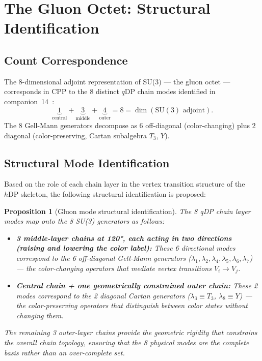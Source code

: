 \documentclass[12pt]{article}
\newtheorem{proposition}[theorem]{Proposition}
\newcommand{\qDP}{q\mathrm{DP}}
\newcommand{\hDP}{h\mathrm{DP}}
\begin{document}
\section{The Gluon Octet: Structural Identification}
\label{sec:gluons}

\subsection{Count Correspondence}

The 8-dimensional adjoint representation of SU(3) --- the gluon
octet --- corresponds in CPP to the 8 distinct $\qDP$ chain modes
identified in companion~14~\cite{c14}:
\begin{equation}
\underbrace{1}_{\text{central}} +
\underbrace{3}_{\text{middle}} +
\underbrace{4}_{\text{outer}} = 8 = \dim(\text{SU}(3)\text{ adjoint}).
\label{eq:8count}
\end{equation}
The 8 Gell-Mann generators decompose as 6 off-diagonal (color-changing)
plus 2 diagonal (color-preserving, Cartan subalgebra $T_3$, $Y$).

\subsection{Structural Mode Identification}

Based on the role of each chain layer in the vertex transition
structure of the $\hDP$ skeleton, the following structural
identification is proposed:

\begin{proposition}[Gluon mode structural identification]
\label{prop:gluon_modes}
The 8 qDP chain layer modes map onto the 8 SU(3) generators as follows:
\begin{itemize}
\item \textbf{3 middle-layer chains at 120°, each acting in two
  directions (raising and lowering the color label):}
  These 6 directional modes correspond to the 6 off-diagonal
  Gell-Mann generators ($\lambda_1, \lambda_2, \lambda_4,
  \lambda_5, \lambda_6, \lambda_7$) --- the color-changing
  operators that mediate vertex transitions $V_i \to V_j$.

\item \textbf{Central chain + one geometrically constrained outer
  chain:}
  These 2 modes correspond to the 2 diagonal Cartan generators
  ($\lambda_3 \equiv T_3$, $\lambda_8 \equiv Y$) --- the
  color-preserving operators that distinguish between color states
  without changing them.
\end{itemize}
The remaining 3 outer-layer chains provide the geometric rigidity
that constrains the overall chain topology, ensuring that the 8
physical modes are the complete basis rather than an over-complete
set.
\end{proposition}
\end{document}

